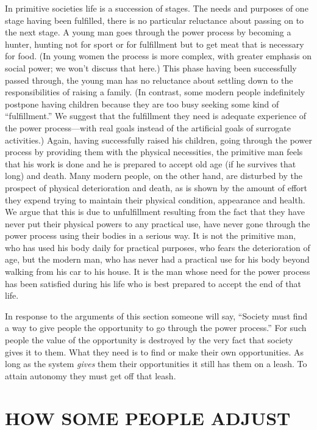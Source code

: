  In primitive societies life is a succession of stages. The needs and purposes of one stage having been fulfilled, there is no particular reluctance about passing on to the next stage. A young man goes through the power process by becoming a hunter, hunting not for sport or for fulfillment but to get meat that is necessary for food. (In young women the process is more complex, with greater emphasis on social power; we won’t discuss that here.) This phase having been successfully passed through, the young man has no reluctance about settling down to the responsibilities of raising a family. (In contrast, some modern people indefinitely postpone having children because they are too busy seeking some kind of “fulfillment.” We suggest that the fulfillment they need is adequate experience of the power process—with real goals instead of the artificial goals of surrogate activities.) Again, having successfully raised his children, going through the power process by providing them with the physical necessities, the primitive man feels that his work is done and he is prepared to accept old age (if he survives that long) and death. Many modern people, on the other hand, are disturbed by the prospect of physical deterioration and death, as is shown by the amount of effort they expend trying to maintain their physical condition, appearance and health. We argue that this is due to unfulfillment resulting from the fact that they have never put their physical powers to any practical use, have never gone through the power process using their bodies in a serious way. It is not the primitive man, who has used his body daily for practical purposes, who fears the deterioration of age, but the modern man, who has never had a practical use for his body beyond walking from his car to his house. It is the man whose need for the power process has been satisfied during his life who is best prepared to accept the end of that life.

 In response to the arguments of this section someone will say, “Society must find a way to give people the opportunity to go through the power process.” For such people the value of the opportunity is destroyed by the very fact that society gives it to them. What they need is to find or make their own opportunities. As long as the system {\em gives} them their opportunities it still has them on a leash. To attain autonomy they must get off that leash.

\chapter{HOW SOME PEOPLE ADJUST}

